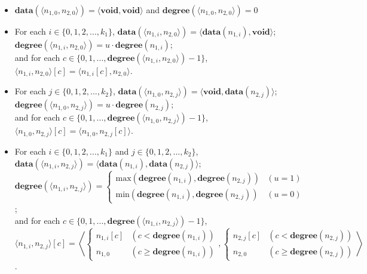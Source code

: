 \documentclass{article}
\begin{document}
\begin{itemize}
\item \(\textbf{data}(\langle n_{1,0}, n_{2,0}\rangle) = \langle \textbf{void}, \textbf{void} \rangle\) and \(\textbf{degree}(\langle n_{1,0}, n_{2,0}\rangle) = 0\)
\item For each \(i \in \{0,1,2,...,k_1\}\), \(\textbf{data}(\langle n_{1,i}, n_{2,0}\rangle) = \langle \textbf{data}(n_{1,i}), \textbf{void} \rangle\); \\ \(\textbf{degree}(\langle n_{1,i}, n_{2,0}\rangle) = u \cdot \textbf{degree}(n_{1,i})\); \\ and for each \(c \in \{0,1,...,\textbf{degree}(\langle n_{1,i}, n_{2,0}\rangle)-1\}\), \(\langle n_{1,i}, n_{2,0}\rangle[c] = \langle n_{1,i}[c], n_{2,0} \rangle\).
\item For each \(j \in \{0,1,2,...,k_2\}\), \(\textbf{data}(\langle n_{1,0}, n_{2,j}\rangle) = \langle \textbf{void}, \textbf{data}(n_{2,j}) \rangle\); \\ \(\textbf{degree}(\langle n_{1,0}, n_{2,j}\rangle) = u \cdot \textbf{degree}(n_{2,j})\); \\ and for each \(c \in \{0,1,...,\textbf{degree}(\langle n_{1,0}, n_{2,j}\rangle)-1\}\), \(\langle n_{1,0}, n_{2,j}\rangle[c] = \langle n_{1,0}, n_{2,j}[c]\rangle\). 
\item For each \(i \in \{0,1,2,...,k_1\}\) and \(j \in \{0,1,2,...,k_2\}\), \\ \(\textbf{data}(\langle n_{1,i}, n_{2,j}\rangle) = \langle \textbf{data}(n_{1,i}), \textbf{data}(n_{2,j}) \rangle\); \\ \(\textbf{degree}(\langle n_{1,i}, n_{2,j}\rangle) = \left\{\begin{array}{cc} \text{max}(\textbf{degree}(n_{1,i}),\textbf{degree}(n_{2,j})) & (u = 1) \\ \text{min}(\textbf{degree}(n_{1,i}),\textbf{degree}(n_{2,j})) & (u = 0) \end{array}\right.\); \\ and for each \(c \in \{0,1,...,\textbf{degree}(\langle n_{1,i}, n_{2,j}\rangle)-1\}\), \\ \(\langle n_{1,i}, n_{2,j}\rangle[c] = \left\langle \left\{\begin{array}{cc} n_{1,i}[c] & (c < \textbf{degree}(n_{1,i})) \\ n_{1,0} & (c \geq \textbf{degree}(n_{1,i})) \end{array}\right., \left\{\begin{array}{cc} n_{2,j}[c] & (c < \textbf{degree}(n_{2,j})) \\ n_{2,0} & (c \geq \textbf{degree}(n_{2,j})) \end{array}\right. \right\rangle\). 
\end{itemize}
\end{document}
